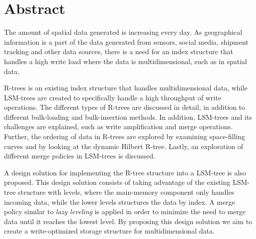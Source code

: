 \chapter*{Abstract}
The amount of spatial data generated is increasing every day. As geographical information is a part of the data generated from sensors, social media, shipment tracking and other data sources, there is a need for an index structure that handles a high write load where the data is multidimensional, such as in spatial data.\newline

\noindent
R-trees is an existing index structure that handles multidimensional data, while LSM-trees are created to specifically handle a high throughput of write operations. The different types of R-trees are discussed in detail, in addition to different bulk-loading and bulk-insertion methods. In addition, LSM-trees and its challenges are explained, such as write amplification and merge operations. Further, the ordering of data in R-trees are explored by examining space-filling curves and by looking at the dynamic Hilbert R-tree. Lastly, an exploration of different merge policies in LSM-trees is discussed.\newline

\noindent
A design solution for implementing the R-tree structure into a LSM-tree is also proposed. This design solution consists of taking advantage of the existing LSM-tree structure with levels, where the main-memory component only handles incoming data, while the lower levels structures the data by index. A merge policy similar to \emph{lazy leveling} is applied in order to minimize the need to merge data until it reaches the lowest level. By proposing this design solution we aim to create a write-optimized storage structure for multidimensional data. 

